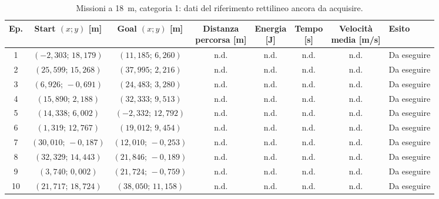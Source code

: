 \begin{table}[H]
\centering
\caption{Missioni a 18~m, categoria 1: dati del riferimento rettilineo ancora da acquisire.}
\label{tab:big-map-18m-baseline-cat1}
\begingroup
\fontsize{9}{11}\selectfont
\setlength{\tabcolsep}{2.5pt}
\renewcommand{\arraystretch}{1.2}
\begin{tabular}{@{}c cc cccc l@{}}
\toprule
Ep. & \shortstack{Start $(x;y)$\\{}[m]} & \shortstack{Goal $(x;y)$\\{}[m]} & \shortstack{Distanza\\percorsa [m]} & \shortstack{Energia\\{}[J]} & \shortstack{Tempo\\{}[s]} & \shortstack{Velocità\\media [m/s]} & Esito \\
\midrule
1 & $(-2{,}303;\,18{,}179)$ & $(11{,}185;\,6{,}260)$ & n.d. & n.d. & n.d. & n.d. & Da eseguire \\
2 & $(25{,}599;\,15{,}268)$ & $(37{,}995;\,2{,}216)$ & n.d. & n.d. & n.d. & n.d. & Da eseguire \\
3 & $(6{,}926;\,-0{,}691)$ & $(24{,}483;\,3{,}280)$ & n.d. & n.d. & n.d. & n.d. & Da eseguire \\
4 & $(15{,}890;\,2{,}188)$ & $(32{,}333;\,9{,}513)$ & n.d. & n.d. & n.d. & n.d. & Da eseguire \\
5 & $(14{,}338;\,6{,}002)$ & $(-2{,}332;\,12{,}792)$ & n.d. & n.d. & n.d. & n.d. & Da eseguire \\
6 & $(1{,}319;\,12{,}767)$ & $(19{,}012;\,9{,}454)$ & n.d. & n.d. & n.d. & n.d. & Da eseguire \\
7 & $(30{,}010;\,-0{,}187)$ & $(12{,}010;\,-0{,}253)$ & n.d. & n.d. & n.d. & n.d. & Da eseguire \\
8 & $(32{,}329;\,14{,}443)$ & $(21{,}846;\,-0{,}189)$ & n.d. & n.d. & n.d. & n.d. & Da eseguire \\
9 & $(3{,}740;\,0{,}002)$ & $(21{,}724;\,-0{,}759)$ & n.d. & n.d. & n.d. & n.d. & Da eseguire \\
10 & $(21{,}717;\,18{,}724)$ & $(38{,}050;\,11{,}158)$ & n.d. & n.d. & n.d. & n.d. & Da eseguire \\
\bottomrule
\end{tabular}
\endgroup
\end{table}

